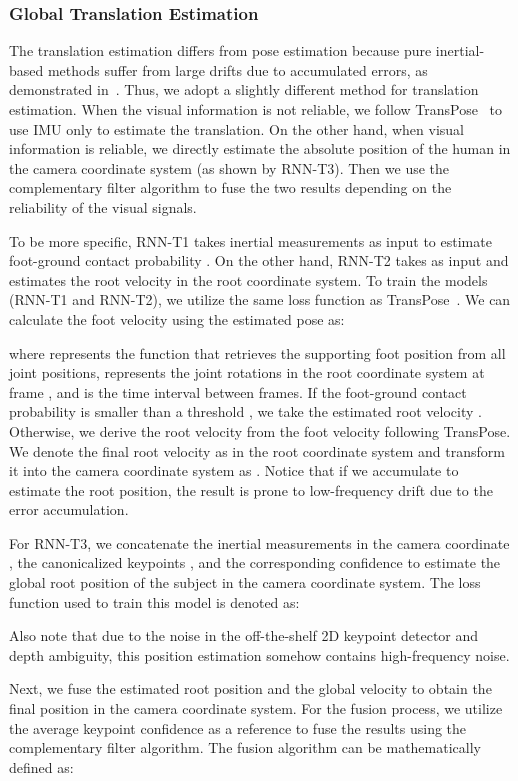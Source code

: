\documentclass[sigconf,nonacm=true]{acmart}
\begin{document}
\subsubsection{Global Translation Estimation}\label{subsubsec:Tran}
The translation estimation differs from pose estimation because pure inertial-based methods suffer from large drifts due to accumulated errors, as demonstrated in~\cite{EgoLocate}.
Thus, we adopt a slightly different method for translation estimation.
When the visual information is not reliable, we follow TransPose~\cite{TransPose} to use IMU only to estimate the translation. 
On the other hand, when visual information is reliable, we directly estimate the absolute position of the human in the camera coordinate system (as shown by RNN-T3).
Then we use the complementary filter algorithm to fuse the two results depending on the reliability of the visual signals.
\par
To be more specific, RNN-T1 takes inertial measurements  as input to estimate foot-ground contact probability .
On the other hand, RNN-T2 takes  as input and estimates the root velocity  in the root coordinate system.
To train the models (RNN-T1 and RNN-T2), we utilize the same loss function as TransPose~\cite{TransPose}.
We can calculate the foot velocity  using the estimated pose  as:

where  represents the function that retrieves the supporting foot position from all joint positions,  represents the joint rotations in the root coordinate system at frame , and  is the time interval between frames.
If the foot-ground contact probability  is smaller than a threshold , we take the estimated root velocity .
Otherwise, we derive the root velocity from the foot velocity  following TransPose.
We denote the final root velocity as   in the root coordinate system and transform it into the camera coordinate system as .
Notice that if we accumulate  to estimate the root position, the result is prone to low-frequency drift due to the error accumulation.
\par
For RNN-T3, we concatenate the inertial measurements in the camera coordinate , the canonicalized keypoints , and the corresponding confidence  to estimate the global root position  of the subject in the camera coordinate system. 
The loss function used to train this model is denoted as:

Also note that due to the noise in the off-the-shelf 2D keypoint detector and depth ambiguity, this position estimation somehow contains high-frequency noise.
\par
Next, we fuse the estimated root position  and the global velocity  to obtain the final position  in the camera coordinate system.
For the fusion process, we utilize the average keypoint confidence  as a reference to fuse the results using the complementary filter algorithm.
The fusion algorithm can be mathematically defined as:
\end{document}
